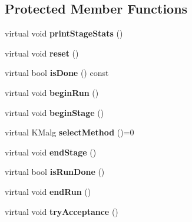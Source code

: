 \subsection*{Protected Member Functions}
\begin{DoxyCompactItemize}
\item 
\hypertarget{class_k_mlocal_a2efd45892cd91be72fcb764b740328ab}{
virtual void {\bfseries printStageStats} ()}
\label{class_k_mlocal_a2efd45892cd91be72fcb764b740328ab}

\item 
\hypertarget{class_k_mlocal_ad1b17b531f0e0ca5b6994bfad8a63a3a}{
virtual void {\bfseries reset} ()}
\label{class_k_mlocal_ad1b17b531f0e0ca5b6994bfad8a63a3a}

\item 
\hypertarget{class_k_mlocal_a0ef0964860a1d458ad4784ea79e40121}{
virtual bool {\bfseries isDone} () const }
\label{class_k_mlocal_a0ef0964860a1d458ad4784ea79e40121}

\item 
\hypertarget{class_k_mlocal_a01ac4a71da1e0a3d6a1c7e78a513f3c7}{
virtual void {\bfseries beginRun} ()}
\label{class_k_mlocal_a01ac4a71da1e0a3d6a1c7e78a513f3c7}

\item 
\hypertarget{class_k_mlocal_a92cbf7c4430f8271f8581cb6250f3ed1}{
virtual void {\bfseries beginStage} ()}
\label{class_k_mlocal_a92cbf7c4430f8271f8581cb6250f3ed1}

\item 
\hypertarget{class_k_mlocal_a80037302b2cbbea327dbdacea0a10e55}{
virtual KMalg {\bfseries selectMethod} ()=0}
\label{class_k_mlocal_a80037302b2cbbea327dbdacea0a10e55}

\item 
\hypertarget{class_k_mlocal_af305cf6900a1e318d1032e04359e8582}{
virtual void {\bfseries endStage} ()}
\label{class_k_mlocal_af305cf6900a1e318d1032e04359e8582}

\item 
\hypertarget{class_k_mlocal_ac2454c3a83d1637561652ffcb9769623}{
virtual bool {\bfseries isRunDone} ()}
\label{class_k_mlocal_ac2454c3a83d1637561652ffcb9769623}

\item 
\hypertarget{class_k_mlocal_ab7074c1af4b43e662e4cbb88cdd83b26}{
virtual void {\bfseries endRun} ()}
\label{class_k_mlocal_ab7074c1af4b43e662e4cbb88cdd83b26}

\item 
\hypertarget{class_k_mlocal_ad4513a52951bdd637247b1ac061118c5}{
virtual void {\bfseries tryAcceptance} ()}
\label{class_k_mlocal_ad4513a52951bdd637247b1ac061118c5}


\end{DoxyCompactItemize}
